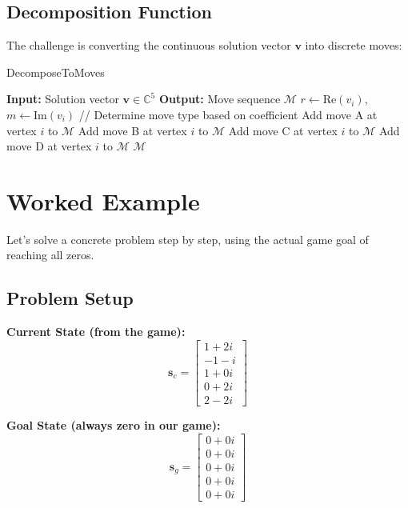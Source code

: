 \documentclass{article}
\begin{document}
\subsection{Decomposition Function}

The challenge is converting the continuous solution vector $\mathbf{v}$ into discrete moves:

\begin{algorithm}
\caption{DecomposeToMoves}
\begin{algorithmic}
\STATE \textbf{Input:} Solution vector $\mathbf{v} \in \mathbb{C}^5$
\STATE \textbf{Output:} Move sequence $\mathcal{M}$
\STATE
{}
    \STATE $r \leftarrow \text{Re}(v_i)$, $m \leftarrow \text{Im}(v_i)$
    \STATE
        \STATE // Determine move type based on coefficient
            \STATE Add move A at vertex $i$ to $\mathcal{M}$
            \STATE Add move B at vertex $i$ to $\mathcal{M}$
            \STATE Add move C at vertex $i$ to $\mathcal{M}$
            \STATE Add move D at vertex $i$ to $\mathcal{M}$
        \ENDIF
    \ENDIF
\ENDFOR
\RETURN $\mathcal{M}$
\end{algorithmic}
\end{algorithm}

\section{Worked Example}

Let's solve a concrete problem step by step, using the actual game goal of reaching all zeros.

\subsection{Problem Setup}

\textbf{Current State (from the game):}
\[
\mathbf{s}_c = \begin{bmatrix} 1 + 2i \\ -1 - i \\ 1 + 0i \\ 0 + 2i \\ 2 - 2i \end{bmatrix}
\]

\textbf{Goal State (always zero in our game):}
\[
\mathbf{s}_g = \begin{bmatrix} 0 + 0i \\ 0 + 0i \\ 0 + 0i \\ 0 + 0i \\ 0 + 0i \end{bmatrix}
\]
\end{document}
